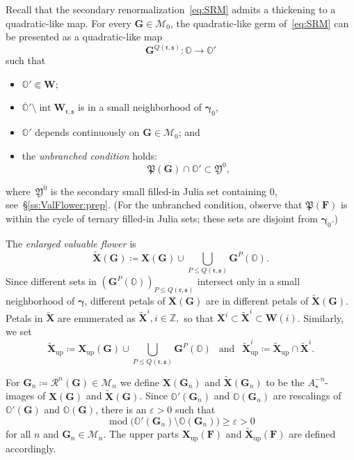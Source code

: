\documentclass{amsart}
\renewcommand{\sp}{{\ \ }}
\newcommand{\1}{{\mathbb 1 }}
\newcommand\MM{\mathscr{M}}
\newcommand\bMM{{\pmb {\MM}}}
\newcommand{\bO}{{\mathbb{O}}}
\newcommand\RR{\mathcal{R}}
\newcommand\intr{\operatorname{int}}
\newcommand\Post{{\mathfrak P}}
\newcommand\frakY{{\mathfrak Y}}
\newcommand{\bF}{{\mathbf F}}
\newcommand{\bX}{{\mathbf X}}
\newcommand{\bW}{{\mathbf W}}
\newcommand{\bG}{{\mathbf G}}
\newcommand{\str}{{\star}}
\newcommand{\rr}{\mathfrak{r}}
\renewcommand{\ss}{\mathfrak{s}}
\newcommand\up{{\operatorname{up}}}
\newcommand{\Z}{\mathbb{Z}}
\theoremstyle{remark}
\numberwithin{equation}{section}
\theoremstyle{definition}
\renewcommand{\mod}{\operatorname{mod}}
\newcommand{\bgamma}{{\boldsymbol{ \gamma}}}
\theoremstyle{nonumberbreak}
\begin{document}
Recall that the secondary renormalization~\eqref{eq:SRM} admits a thickening to a quadratic-like map. For every $\bG\in \bMM_0$, the quadratic-like germ of~\eqref{eq:SRM} can be presented as a quadratic-like map 
\begin{equation}
\label{eq:QL domain bO}
\bG^{Q(\rr,\ss)}\colon \bO \to \bO'
\end{equation} 
such that
\begin{itemize}
\item $\bO'\Subset \bW$;
\item $\overline \bO'\setminus \intr \bW_{\rr,\ss}$ is in a small neighborhood of $\bgamma_0$,
\item $\bO'$ depends continuously on $\bG\in \bMM_0$; and
\item the \emph{unbranched condition} holds:
\begin{equation}
\label{eq:unbr cond:bMM}
 \Post(\bG)\cap \bO'\subset \frakY^0,
 \end{equation} 
\end{itemize}
where~$\frakY^0$ is the secondary small filled-in Julia set containing $0$, see~\S\ref{ss:ValFlower:prep}.
(For the unbranched condition, observe that $\Post(\bF)$ is within the cycle of ternary filled-in Julia sets; these sets are disjoint from $\bgamma_0$.)  

The \emph{enlarged valuable flower} is 
\[\widetilde \bX(\bG) \coloneqq \bX(\bG)\cup \bigcup_{P\le Q(\rr,\ss)} \bG^P(\bO).\] 
Since different  sets in $(\bG^P(\bO))_{P\le Q(\rr,\ss)}$ intersect only in a small neighborhood of $\bgamma$, different petals of  $\bX(\bG)$ are in different petals of  $\widetilde \bX(\bG)$. Petals in $\widetilde\bX$ are enumerated as $\widetilde \bX^i, i\in \Z,$ so that $\bX^i\subset\widetilde \bX^i\subset \bW(i)$. Similarly, we set \[\widetilde \bX_\up\coloneqq \bX_\up(\bG)\cup \bigcup_{P\le Q(\rr,\ss)} \bG^P(\bO)\sp \text{ and }\sp \widetilde \bX_\up^i\coloneqq \widetilde \bX_\up\cap \widetilde \bX^i.\]


For $\bG_n\coloneqq \RR^n(\bG)\in \bMM_n$ we define $ \bX(\bG_n)$ and  $\widetilde \bX(\bG_n)$ to be the $A_\str^{-n}$-images of $\bX(\bG)$ and  $\widetilde \bX(\bG)$. Since $\bO'(\bG_n)$ and $\bO(\bG_n)$ are rescalings of $\bO'(\bG)$ and $\bO(\bG)$, there is an $\varepsilon>0$ such that 
\[\mod\big( \bO'(\bG_n) \setminus \bO(\bG_n) \big)\ge \varepsilon>0\] for all $n$ and $\bG_n\in \bMM_n$. The upper parts $\bX_\up(\bF) $ and $\widetilde \bX_\up (\bF)$ are defined accordingly.
\end{document}
